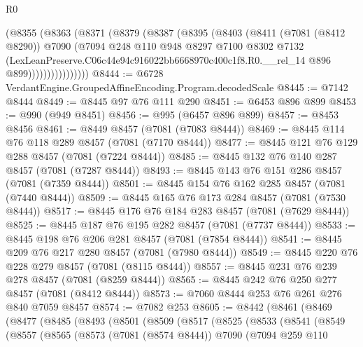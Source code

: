 \begin{lexlean}{R0}
\begin{coremodule}
                (@8355
                  (@8363
                    (@8371
                      (@8379
                        (@8387
                          (@8395
                            (@8403
                              (@8411
                                (@7081 (@8412 @8290))
                                @7090
                                (@7094
                                  @248
                                  @110
                                  @948
                                  @8297
                                  @7100
                                  @8302
                                  @7132
                                  (LexLeanPreserve.C06c44e94c916022bb6668970c400c1f8.R0.__rel_14
                                    @896
                                    @899))))))))))))))))
@8444 := @6728 VerdantEngine.GroupedAffineEncoding.Program.decodedScale
@8445 := @7142 @8444
@8449 := @8445 @97 @76 @111 @290
@8451 := @6453 @896 @899
@8453 := @990 (@949 @8451)
@8456 := @995 (@6457 @896 @899)
@8457 := @8453 @8456
@8461 := @8449 @8457 (@7081 (@7083 @8444))
@8469 := @8445 @114 @76 @118 @289 @8457 (@7081 (@7170 @8444))
@8477 := @8445 @121 @76 @129 @288 @8457 (@7081 (@7224 @8444))
@8485 := @8445 @132 @76 @140 @287 @8457 (@7081 (@7287 @8444))
@8493 := @8445 @143 @76 @151 @286 @8457 (@7081 (@7359 @8444))
@8501 := @8445 @154 @76 @162 @285 @8457 (@7081 (@7440 @8444))
@8509 := @8445 @165 @76 @173 @284 @8457 (@7081 (@7530 @8444))
@8517 := @8445 @176 @76 @184 @283 @8457 (@7081 (@7629 @8444))
@8525 := @8445 @187 @76 @195 @282 @8457 (@7081 (@7737 @8444))
@8533 := @8445 @198 @76 @206 @281 @8457 (@7081 (@7854 @8444))
@8541 := @8445 @209 @76 @217 @280 @8457 (@7081 (@7980 @8444))
@8549 := @8445 @220 @76 @228 @279 @8457 (@7081 (@8115 @8444))
@8557 := @8445 @231 @76 @239 @278 @8457 (@7081 (@8259 @8444))
@8565 := @8445 @242 @76 @250 @277 @8457 (@7081 (@8412 @8444))
@8573 := @7060 @8444 @253 @76 @261 @276 @840 @7059 @8457
@8574 := @7082 @253
@8605 := @8442
    (@8461
      (@8469
        (@8477
          (@8485
            (@8493
              (@8501
                (@8509
                  (@8517
                    (@8525
                      (@8533
                        (@8541
                          (@8549
                            (@8557
                              (@8565
                                (@8573
                                  (@7081 (@8574 @8444))
                                  @7090
                                  (@7094
                                    @259
                                    @110

\end{coremodule}
\end{lexlean}
